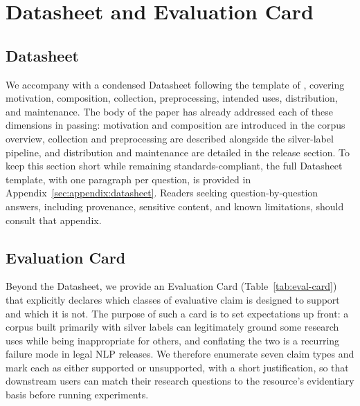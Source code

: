 
\section{Datasheet and Evaluation Card}
\label{sec:datasheet}

\subsection{Datasheet}
\label{sec:datasheet:datasheet}

We accompany \juddgespl{} with a condensed Datasheet following the template of \citet{gebru2021datasheets}, covering motivation, composition, collection, preprocessing, intended uses, distribution, and maintenance. The body of the paper has already addressed each of these dimensions in passing: motivation and composition are introduced in the corpus overview, collection and preprocessing are described alongside the silver-label pipeline, and distribution and maintenance are detailed in the release section. To keep this section short while remaining standards-compliant, the full Datasheet template, with one paragraph per question, is provided in Appendix~\ref{sec:appendix:datasheet}. Readers seeking question-by-question answers, including provenance, sensitive content, and known limitations, should consult that appendix.

\subsection{Evaluation Card}
\label{sec:datasheet:eval-card}

Beyond the Datasheet, we provide an Evaluation Card (Table~\ref{tab:eval-card}) that explicitly declares which classes of evaluative claim \juddgespl{} is designed to support and which it is not. The purpose of such a card is to set expectations up front: a corpus built primarily with silver labels can legitimately ground some research uses while being inappropriate for others, and conflating the two is a recurring failure mode in legal NLP releases. We therefore enumerate seven claim types and mark each as either supported or unsupported, with a short justification, so that downstream users can match their research questions to the resource's evidentiary basis before running experiments.

